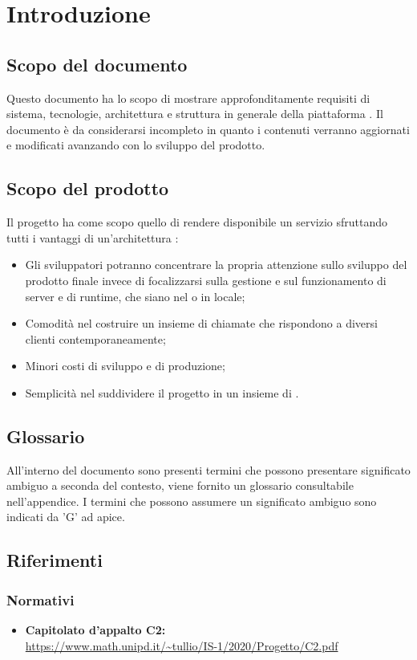 \section{Introduzione}
\label{introduzione}
\subsection{Scopo del documento}
Questo documento ha lo scopo di mostrare approfonditamente requisiti di sistema, tecnologie, architettura e struttura in generale della piattaforma \NomeProgetto. Il documento è da considerarsi incompleto in quanto i contenuti verranno aggiornati e modificati avanzando con lo sviluppo del prodotto.
\subsection{Scopo del prodotto} 
Il progetto {\NomeProgetto} ha come scopo quello di rendere disponibile un servizio  sfruttando tutti i vantaggi di un'architettura :
\begin{itemize}
	\item Gli sviluppatori potranno concentrare la propria attenzione sullo sviluppo del prodotto finale invece di focalizzarsi sulla gestione e sul funzionamento di server e di runtime, che siano nel  o in locale;
	\item Comodità nel costruire un insieme di chiamate  che rispondono a diversi clienti contemporaneamente;
	\item Minori costi di sviluppo e di produzione;
	\item Semplicità nel suddividere il progetto in un insieme di .
\end{itemize}
\subsection{Glossario}
All'interno del documento sono presenti termini che possono presentare significato ambiguo a seconda del contesto, viene fornito un glossario consultabile nell'appendice. I termini che possono assumere un significato ambiguo sono indicati da 'G' ad apice. 

\subsection{Riferimenti}
\subsubsection{Normativi}
\begin{itemize}
	\item \textbf{Capitolato d'appalto C2:}\\
	\url{https://www.math.unipd.it/~tullio/IS-1/2020/Progetto/C2.pdf}
\end{itemize}
